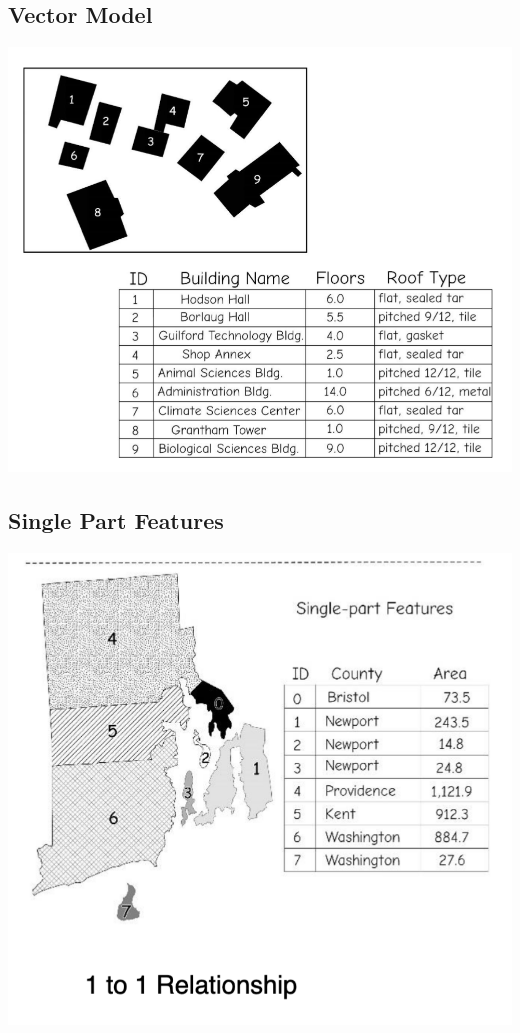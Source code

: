 \documentclass[11pt]{article}
\theoremstyle{definition}
\begin{document}
\subsection{Vector Model}
\includegraphics[width=\textwidth/3]{22.png}

\subsection{Single Part Features}
\includegraphics[width=\textwidth/3]{23.png}
\end{document}
